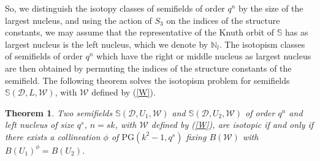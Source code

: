 \documentclass[12pt]{amsart}
\newtheorem{theorem}{\sc Theorem}[section]
\def\PG{\mathrm{PG}}
\def\S{\mathbb{S}}
\def\W{\mathcal{W}}
\def\D{\mathcal{D}}
\def\N{\mathbb{N}}
\begin{document}
So, we distinguish the isotopy classes of semifields of order $q^n$ by the size of
the largest nucleus, and using the action of $S_3$ on the indices of the structure constants, 
we may assume that the representative of the Knuth orbit of $\S$ has as largest nucleus is the left nucleus, which we denote by $\N_l$. 
The isotopism classes of semifields of order $q^n$ which have the right or middle nucleus as largest nucleus are then obtained by permuting the indices of the structure constants of
the semifield. The following theorem solves the isotopism problem for semifields  $\S(\D,L,\W)$, with
$\W$ defined by (\ref{W}).
\begin{theorem}\label{thm:isotopism}
Two semifields $\S(\D,U_1,\W)$ and $\S(\D,U_2,\W)$ of order $q^n$ and left nucleus of size $q^s$, $n=sk$, with $\W$ defined by (\ref{W}), are isotopic if and only if there exists a collineation $\phi$ of $\PG(k^2-1,q^s)$ fixing $B(\W)$ with $B(U_1)^\phi=B(U_2)$.
\end{theorem}
\end{document}
